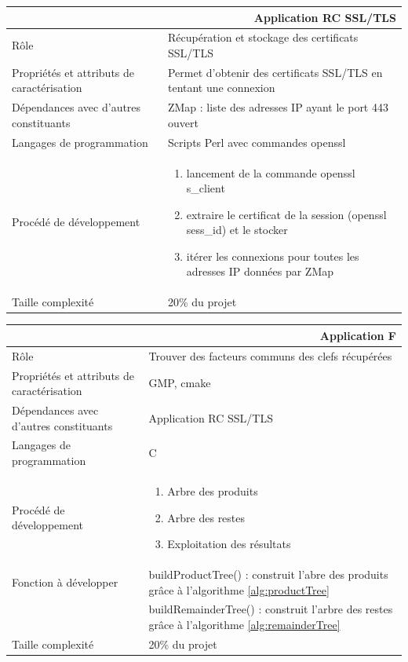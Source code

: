 \documentclass[a4paper,11pt,french]{article}
\begin{document}
\begin{center}
	\vspace*{0.7cm}
	\begin{tabularx}{16cm}{|l|X|}
	\hline
	\multicolumn{2}{|r|}{\textbf{Application RC SSL/TLS}}\\
	\hline
	R\^ole & Récupération et stockage des certificats SSL/TLS \\
	\hline
	Propriétés et attributs de caractérisation & Permet d'obtenir des certificats SSL/TLS en tentant une connexion  \\
	\hline
	Dépendances avec d'autres constituants & ZMap : liste des adresses IP ayant le port 443 ouvert\\
	\hline
	Langages de programmation & Scripts Perl avec commandes openssl \\
	\hline
	Procédé de développement & \begin{enumerate} \item lancement de la commande openssl s\_client \item extraire le certificat de la session (openssl sess\_id) et le stocker \item itérer les connexions pour toutes les adresses IP données par ZMap \end{enumerate} \\
	\hline
	Taille complexité & 20\% du projet\\
	\hline
	\end{tabularx}
\end{center}


\begin{center}
	\vspace*{0.7cm}
	\begin{tabularx}{16cm}{|l|X|}
	\hline
	\multicolumn{2}{|r|}{\textbf{Application F}}\\
	\hline
	R\^ole & Trouver des facteurs communs des clefs récupérées\\
	\hline
	Propriétés et attributs de caractérisation & GMP, cmake\\
	\hline
	Dépendances avec d'autres constituants & Application RC SSL/TLS\\
	\hline
	Langages de programmation & C\\
	\hline
	Procédé de développement & \begin{enumerate} \item Arbre des produits \item Arbre des restes \item Exploitation des résultats \end{enumerate}\\
	\hline
	Fonction à développer & buildProductTree() : construit l'abre des produits grâce à l'algorithme \ref{alg:productTree}\\
	& buildRemainderTree() : construit l'arbre des restes grâce à l'algorithme \ref{alg:remainderTree}\\
	\hline
	Taille complexité & 20\% du projet\\
	\hline
	\end{tabularx}
\end{center}
\end{document}
